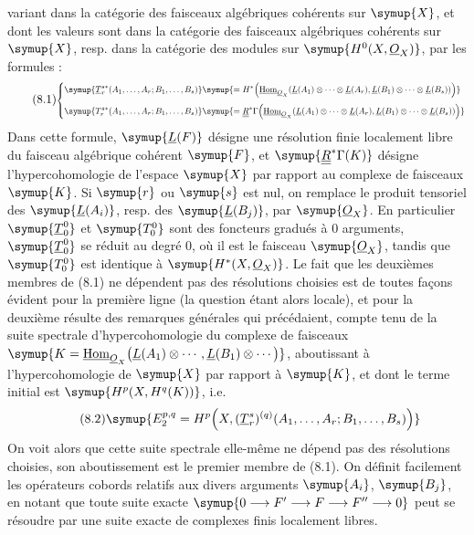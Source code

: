 variant dans la catégorie des faisceaux algébriques cohérents sur $\symup{X}$, et dont
les valeurs sont dans la catégorie des faisceaux algébriques cohérents sur $\symup{X}$,
resp. dans la catégorie des modules sur $\symup{H^{0}(X,\Osh_X)}$, par les formules :
\begin{equation}\tag{8.1}
\resizebox{\textwidth}{!}{$
\left\{
\begin{aligned}
\symup{\underline{T}_{r}^{s*}(A_1,\ldots,A_r;B_1,\ldots,B_s)}
&
\symup{={}H^{*}\!\left(
    \Homsh_{\Osh_X}\!\left(
      \underline{L}(A_1)\otimes\cdots\otimes \underline{L}(A_r),
      \underline{L}(B_1)\otimes\cdots\otimes \underline{L}(B_s)
    \right)\right)}
\\[3pt]
\symup{T_{r}^{s*}(A_1,\ldots,A_r;B_1,\ldots,B_s)}
&
\symup{={}\underline{\underline{R}}^{*}\Gamma\!\left(
    \Homsh_{\Osh_X}\!\left(
      \underline{L}(A_1)\otimes\cdots\otimes \underline{L}(A_r),
      \underline{L}(B_1)\otimes\cdots\otimes \underline{L}(B_s)
    \right)\right)}
\end{aligned}
\right.
$}
\end{equation}
Dans cette formule, $\symup{\underline{L}(F)}$ désigne une résolution finie localement libre du
faisceau algébrique cohérent $\symup{F}$, et $\symup{\underline{\underline{R}}^{*}\Gamma(K)}$ désigne
l'hypercohomologie de l'espace $\symup{X}$ par rapport au complexe de faisceaux $\symup{K}$. Si
$\symup{r}$ ou $\symup{s}$ est nul, on remplace le produit tensoriel des $\symup{\underline{L}(A_i)}$, resp. des
$\symup{\underline{L}(B_j)}$, par $\symup{\Osh_X}$. En particulier $\symup{\underline{T}_{0}^{0}}$ et $\symup{T_{0}^{0}}$
sont des foncteurs gradués à 0 arguments, $\symup{\underline{T}_{0}^{0}}$ se réduit au
degré 0, où il est le faisceau $\symup{\Osh_X}$, tandis que $\symup{T_{0}^{0}}$ est identique à
$\symup{H^{*}(X,\Osh_X)}$. Le fait que les deuxièmes membres de (8.1) ne dépendent pas
des résolutions choisies est de toutes façons évident pour la première ligne
(la question étant alors locale), et pour la deuxième résulte des remarques
générales qui précédaient, compte tenu de la suite spectrale
d'hypercohomologie du complexe de faisceaux
$\symup{K=\Homsh_{\Osh_X}\bigl(\underline{L}(A_1)\otimes\cdots,
      \underline{L}(B_1)\otimes\cdots\bigr)}$, aboutissant à l'hypercohomologie de $\symup{X}$ par rapport à $\symup{K}$, et dont le terme
initial est $\symup{H^{p}(X,H^{q}(K))}$, i.e.
\begin{equation}\tag{8.2}
  \symup{E_{2}^{p,q}
  =H^{p}\!\left(X,
    (\underline{T}_{r}^{s})^{(q)}
      (A_1,\ldots,A_r;B_1,\ldots,B_s)\right)}
\end{equation}
On voit alors que cette suite spectrale elle-même ne dépend pas des résolutions
choisies, son aboutissement est le premier membre de (8.1). On définit
facilement les opérateurs cobords relatifs aux divers arguments $\symup{A_i}$, $\symup{B_j}$,
en notant que toute suite exacte
$\symup{0\longrightarrow F'\longrightarrow F\longrightarrow F''\longrightarrow0}$
peut se résoudre par une suite exacte de complexes finis localement libres.


